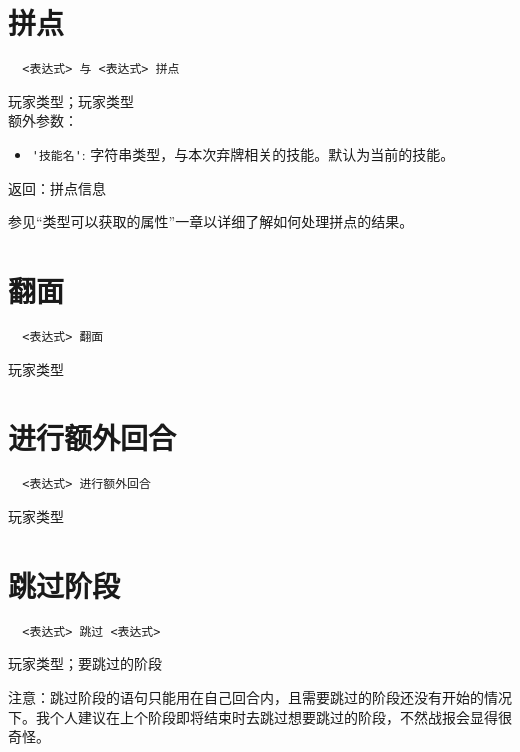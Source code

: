 \section{拼点}

\begin{verbatim}
  <表达式> 与 <表达式> 拼点
\end{verbatim}

玩家类型；玩家类型 \\

额外参数：

\begin{itemize}
  \item \verb|'技能名'|: 字符串类型，与本次弃牌相关的技能。默认为当前的技能。
\end{itemize}

返回：拼点信息

参见“类型可以获取的属性”一章以详细了解如何处理拼点的结果。

\section{翻面}

\begin{verbatim}
  <表达式> 翻面
\end{verbatim}

玩家类型

\section{进行额外回合}

\begin{verbatim}
  <表达式> 进行额外回合
\end{verbatim}

玩家类型

\section{跳过阶段}

\begin{verbatim}
  <表达式> 跳过 <表达式>
\end{verbatim}

玩家类型；要跳过的阶段

注意：跳过阶段的语句只能用在自己回合内，且需要跳过的阶段还没有开始的情况下。我个人建议在上个阶段即将结束时去跳过想要跳过的阶段，不然战报会显得很奇怪。
